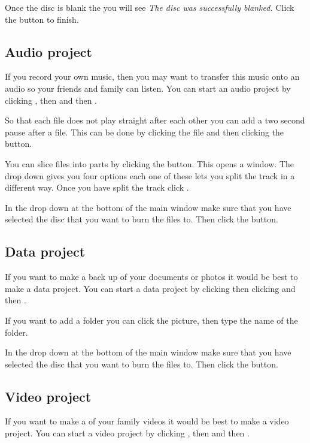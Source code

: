 Once the disc is blank the you will see \emph{The disc was successfully blanked.} Click the  button to finish.


\subsection{Audio project}

If you record your own music, then you may want to transfer this music onto an audio  so your friends and family can listen. You can start an audio project by clicking , then  and then .

So that each file does not play straight after each other you can add a two second
 pause after a file. This can be done by clicking the file and then clicking the 
\button{||} button.

You can slice files into parts by clicking the  button. This 
opens a  window. The  drop down gives you 
four options each one of these lets you split the track in a different way. Once 
you have split the track click .

In the drop down at the bottom of the main  window make sure that you have
selected the disc that you want to burn the files to. Then click the  button.

\subsection{Data project}

If you want to make a back up of your documents or photos it would be best to make a data project.
You can start a data project by clicking 
then clicking  and then .

If you want to add a folder you can click the  picture, then type 
the name of the folder.

In the drop down at the bottom of the main  window make sure that you have
selected the disc that you want to burn the files to. Then click the  button.

\subsection{Video project}

If you want to make a  of your family videos it would be best to make a video project.
You can start a video project by clicking , then  and then .

